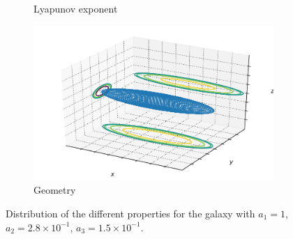 \begin{figure}[h]
\begin{subfigure}[t]{0.4\textwidth}
        \caption{Lyapunov exponent}
    \end{subfigure}
    \begin{subfigure}[t]{0.4\textwidth}
        \includegraphics[width=\textwidth]{"../Files/Week 13/images/14_ellipsoid"}
        \caption{Geometry}
    \end{subfigure}
    \caption{Distribution of the different properties for the galaxy with $a_1 = 1$, $a_2 = 2.8\times10^{-1}$, $a_3 = 1.5\times10^{-1}$.}
    \label{fig: g20}
\end{figure}


